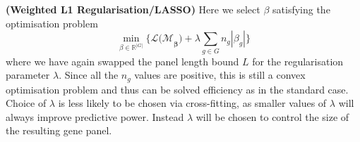 \documentclass[thesis.tex]{subfiles}
\begin{document}
\begin{technique}{\textbf{(Weighted L1 Regularisation/LASSO)}} 
Here we select $\beta$ satisfying the optimisation problem
$$\min_{\beta \in \mathbb{R}^{|G|}} \{\mathcal{L(M}_\mathbf{\beta}) + \lambda\sum\limits_{g \in G}n_g|\beta_g| \} $$
where we have again swapped the panel length bound $L$ for the regularisation parameter $\lambda$. Since all the $n_g$ values are positive, this is still a convex optimisation problem and thus can be solved efficiency as in the standard case. Choice of $\lambda$ is less likely to be chosen via cross-fitting, as smaller values of $\lambda$ will always improve predictive power. Instead $\lambda$ will be chosen to control the size of the resulting gene panel.

\end{technique}





\end{document}

